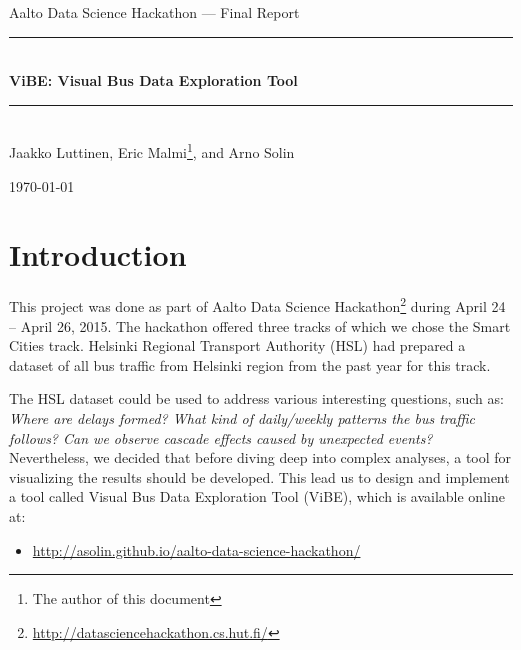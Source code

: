 \documentclass[a4paper,12pt]{article}
\title{\reporttitle}
\author{\authorA}
\newcommand{\reporttitle}{ViBE: Visual Bus Data Exploration Tool}
\begin{document}
\setlength{\abovecaptionskip}{10pt}
\setlength{\belowcaptionskip}{10pt}
\renewcommand{\captionlabelfont}{\bf}
\newcommand{\eref}[1]{(\ref{#1})}
\newcommand{\HRule}{\rule{\linewidth}{0.5mm}}


\thispagestyle{empty}
\begin{center}

\noindent\Large{Aalto Data Science Hackathon --- Final Report}\\
\vspace*{0.5cm}
\HRule  \\
\vspace*{0.3cm}
\noindent\LARGE{\textbf{\reporttitle}}\\
\HRule  \\
\vspace*{1cm}
\noindent\Large{Jaakko Luttinen, Eric Malmi\footnote{The author of this 
document}, and Arno Solin}\\
\vspace*{1cm}

{\Large \today}

\vspace*{0.5cm}

\end{center}

\section{Introduction}

This project was done as part of Aalto Data Science 
Hackathon\footnote{\url{http://datasciencehackathon.cs.hut.fi/}} during April 
24 -- April 26, 2015. The hackathon offered three tracks of which we chose the 
Smart Cities track. Helsinki Regional Transport Authority (HSL) had 
prepared a dataset of all bus traffic from Helsinki region from the past year 
for this track.

The HSL dataset could be used to address various interesting questions, such 
as: \emph{Where are delays formed? What kind of daily/weekly patterns the bus 
traffic follows? Can we observe cascade effects caused by unexpected events?}
Nevertheless, we decided that before diving deep into complex 
analyses, a tool for visualizing the results should be developed. This lead us 
to design and implement a tool called Visual Bus Data Exploration Tool (ViBE), 
which is available online at:
\begin{itemize}
\item[] \url{http://asolin.github.io/aalto-data-science-hackathon/}
\end{itemize}
\end{document}
